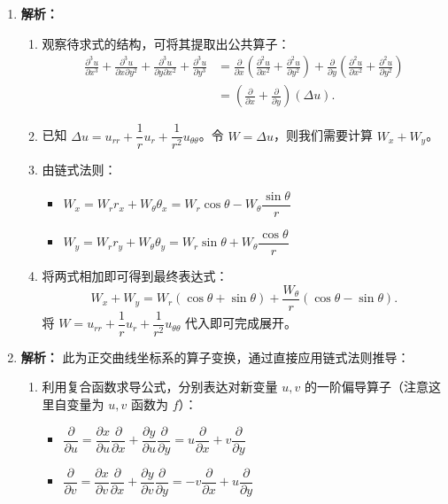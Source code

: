 \documentclass[lang=cn,11pt]{elegantbook}
\begin{document}
\begin{solution}
\begin{enumerate}
  \item[(2)] \textbf{解析：}
  \begin{enumerate}
      \item 观察待求式的结构，可将其提取出公共算子：
      \begin{align*}
      \frac{\partial^3 u}{\partial x^3} + \frac{\partial^3 u}{\partial x\partial y^2} + \frac{\partial^3 u}{\partial y\partial x^2} + \frac{\partial^3 u}{\partial y^3}
      &= \frac{\partial}{\partial x}\left(\frac{\partial^2 u}{\partial x^2} + \frac{\partial^2 u}{\partial y^2}\right) + \frac{\partial}{\partial y}\left(\frac{\partial^2 u}{\partial x^2} + \frac{\partial^2 u}{\partial y^2}\right) \\[6pt]
      &= \left(\frac{\partial}{\partial x} + \frac{\partial}{\partial y}\right)(\Delta u).
      \end{align*}
      \item 已知 $\Delta u = u_{rr} + \dfrac{1}{r}u_r + \dfrac{1}{r^2}u_{\theta\theta}$。令 $W = \Delta u$，则我们需要计算 $W_x + W_y$。
      \item 由链式法则：
      \begin{itemize}
          \item $W_x = W_r r_x + W_\theta \theta_x = W_r \cos\theta - W_\theta \dfrac{\sin\theta}{r}$
          \item $W_y = W_r r_y + W_\theta \theta_y = W_r \sin\theta + W_\theta \dfrac{\cos\theta}{r}$
      \end{itemize}
      \item 将两式相加即可得到最终表达式：
      \[
      W_x + W_y = W_r(\cos\theta + \sin\theta) + \frac{W_\theta}{r}(\cos\theta - \sin\theta).
      \]
      将 $W = u_{rr} + \dfrac{1}{r}u_r + \dfrac{1}{r^2}u_{\theta\theta}$ 代入即可完成展开。
  \end{enumerate}

  \item[(3)] \textbf{解析：}
  此为正交曲线坐标系的算子变换，通过直接应用链式法则推导：
  \begin{enumerate}
      \item 利用复合函数求导公式，分别表达对新变量 $u,v$ 的一阶偏导算子（注意这里自变量为 $u,v$ 函数为 $f$）：
      \begin{itemize}
          \item $\dfrac{\partial}{\partial u} = \dfrac{\partial x}{\partial u}\dfrac{\partial}{\partial x} + \dfrac{\partial y}{\partial u}\dfrac{\partial}{\partial y} = u\dfrac{\partial}{\partial x} + v\dfrac{\partial}{\partial y}$
          \item $\dfrac{\partial}{\partial v} = \dfrac{\partial x}{\partial v}\dfrac{\partial}{\partial x} + \dfrac{\partial y}{\partial v}\dfrac{\partial}{\partial y} = -v\dfrac{\partial}{\partial x} + u\dfrac{\partial}{\partial y}$
      \end{itemize}
      

\end{enumerate}
\end{enumerate}
\end{solution}
\end{document}
